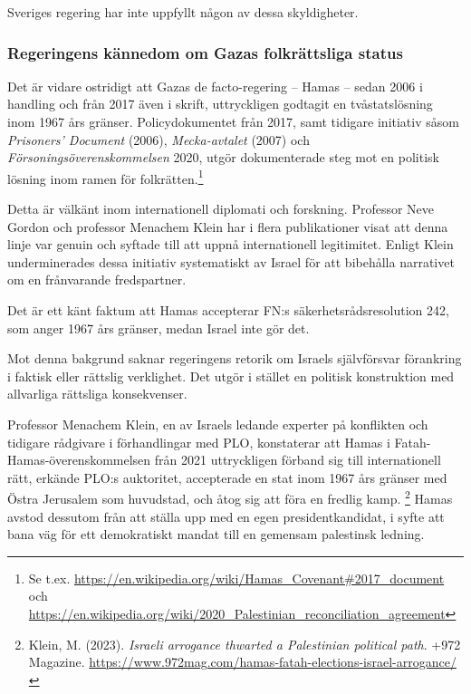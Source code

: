 Sveriges regering har inte uppfyllt någon av dessa skyldigheter.

\medskip

\subsubsection{Regeringens kännedom om Gazas folkrättsliga status}

Det är vidare ostridigt att Gazas de facto-regering – Hamas – sedan 2006 i handling och från 2017 även i skrift, 
uttryckligen godtagit en tvåstatslösning inom 1967 års gränser. Policydokumentet från 2017, samt tidigare initiativ 
såsom \textit{Prisoners’ Document} (2006), \textit{Mecka-avtalet} (2007) och \textit{Försoningsöverenskommelsen} 2020, 
utgör dokumenterade steg mot en politisk lösning inom ramen för folkrätten.\footnote{Se t.ex. \url{https://en.wikipedia.org/wiki/Hamas_Covenant\#2017_document} och \url{https://en.wikipedia.org/wiki/2020_Palestinian_reconciliation_agreement}}

Detta är välkänt inom internationell diplomati och forskning. Professor Neve Gordon och professor Menachem Klein 
har i flera publikationer visat att denna linje var genuin och syftade till att uppnå internationell legitimitet. 
Enligt Klein underminerades dessa initiativ systematiskt av Israel för att bibehålla narrativet om en frånvarande fredspartner.

Det är ett känt faktum att Hamas accepterar FN:s säkerhetsrådsresolution 242, som anger 1967 års gränser, medan Israel inte gör det.

Mot denna bakgrund saknar regeringens retorik om Israels självförsvar förankring i faktisk eller rättslig verklighet. 
Det utgör i stället en politisk konstruktion med allvarliga rättsliga konsekvenser.

Professor Menachem Klein, en av Israels ledande experter på konflikten och tidigare rådgivare i förhandlingar med PLO, 
konstaterar att Hamas i Fatah-Hamas-överenskommelsen från 2021 uttryckligen förband sig till internationell rätt, 
erkände PLO:s auktoritet, accepterade en stat inom 1967 års gränser med Östra Jerusalem som huvudstad, 
och åtog sig att föra en fredlig kamp.%
\footnote{Klein, M. (2023). \textit{Israeli arrogance thwarted a Palestinian political path}. +972 Magazine. \url{https://www.972mag.com/hamas-fatah-elections-israel-arrogance/}} 
Hamas avstod dessutom från att ställa upp med en egen presidentkandidat, i syfte att bana väg för ett demokratiskt mandat 
till en gemensam palestinsk ledning.

